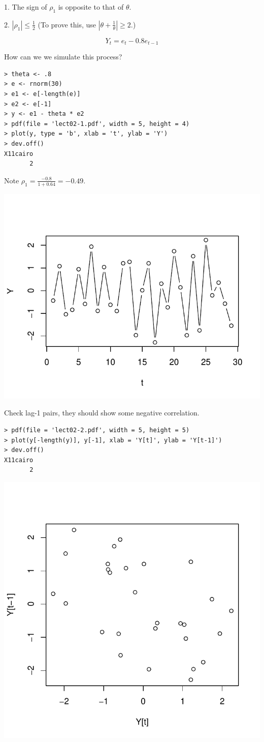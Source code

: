 \documentclass[12pt]{article}
\begin{document}
\alert
1. The sign of $\rho_1$ is opposite to that of $\theta$.

2. $|\rho_1| \le \frac{1}{2}$ (To prove this, use
$\left|\theta + \frac{1}{\theta}\right| \ge 2$.)

\example
\[
Y_t = e_t - 0.8 e_{t-1}
\]

How can we we simulate this process?

\begin{verbatim}
> theta <- .8
> e <- rnorm(30)
> e1 <- e[-length(e)]
> e2 <- e[-1]
> y <- e1 - theta * e2
> pdf(file = 'lect02-1.pdf', width = 5, height = 4)
> plot(y, type = 'b', xlab = 't', ylab = 'Y')
> dev.off()
X11cairo 
       2 
\end{verbatim}

Note $\rho_1 = \frac{-0.8}{1 + 0.64} = -0.49$.

\includegraphics[width=.7\textwidth]{lect02-1.pdf}

Check lag-1 pairs, they should show some negative correlation.

\begin{verbatim}
> pdf(file = 'lect02-2.pdf', width = 5, height = 5)
> plot(y[-length(y)], y[-1], xlab = 'Y[t]', ylab = 'Y[t-1]')
> dev.off()
X11cairo 
       2 
\end{verbatim}

\includegraphics[width=.7\textwidth]{lect02-2.pdf}
\end{document}
